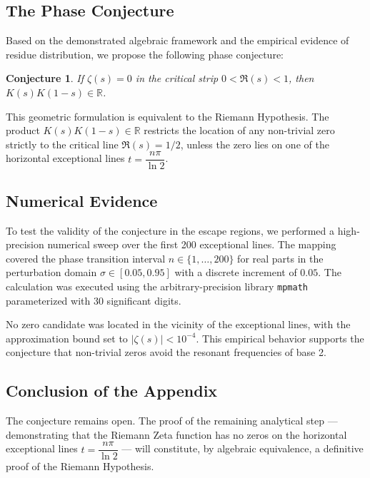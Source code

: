 \documentclass[12pt,a4paper]{article}
\theoremstyle{plain}
\newtheorem{conjecture}[theorem]{Conjecture}
\begin{document}
\subsection{The Phase Conjecture}

Based on the demonstrated algebraic framework and the empirical
evidence of residue distribution, we propose the following phase
conjecture:

\begin{conjecture}
If $\zeta(s) = 0$ in the critical strip $0 < \mathfrak{R}(s) < 1$, then
$K(s)K(1-s) \in \mathbb{R}$.
\end{conjecture}

This geometric formulation is equivalent to the Riemann Hypothesis. The
product $K(s)K(1-s) \in \mathbb{R}$ restricts the location of any
non-trivial zero strictly to the critical line $\mathfrak{R}(s) = 1/2$,
unless the zero lies on one of the horizontal exceptional lines
$t = \dfrac{n\pi}{\ln 2}$.

\subsection{Numerical Evidence}

To test the validity of the conjecture in the escape regions, we
performed a high-precision numerical sweep over the first 200
exceptional lines. The mapping covered the phase transition interval
$n \in \{1, \dots, 200\}$ for real parts in the perturbation domain
$\sigma \in [0.05, 0.95]$ with a discrete increment of $0.05$. The
calculation was executed using the arbitrary-precision library
\texttt{mpmath} parameterized with 30 significant digits.

No zero candidate was located in the vicinity of the exceptional lines,
with the approximation bound set to $|\zeta(s)| < 10^{-4}$. This
empirical behavior supports the conjecture that non-trivial zeros
avoid the resonant frequencies of base 2.

\subsection{Conclusion of the Appendix}

The conjecture remains open. The proof of the remaining analytical
step --- demonstrating that the Riemann Zeta function has no zeros on
the horizontal exceptional lines $t = \dfrac{n\pi}{\ln 2}$ ---
will constitute, by algebraic equivalence, a definitive proof of the
Riemann Hypothesis.
\end{document}
